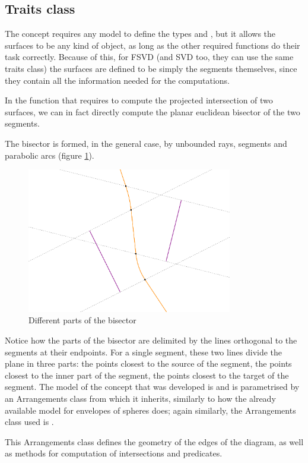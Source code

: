 \documentclass[11pt,a4paper,english]{article}
\begin{document}
	\subsection{Traits class }
	The  concept requires any model to define the types  and , but it allows the surfaces to be any kind of object, as long as the other required functions do their task correctly. Because of this, for FSVD (and SVD too, they can use the same traits class) the surfaces are defined to be simply the segments themselves, since they contain all the information needed for the computations.\par
	In the function that requires to compute the projected intersection of two surfaces, we can in fact directly compute the planar euclidean bisector of the two segments.\par
	The bisector is formed, in the general case, by unbounded rays, segments and parabolic arcs (figure \ref{fig:areas_of_influence}).\ppar
	\begin{figure}[h]
    \centering
    \includegraphics[width=0.8\textwidth]{areas_of_influence}
    \caption{Different parts of the bisector\label{fig:areas_of_influence}}
	\end{figure}
	Notice how the parts of the bisector are delimited by the lines orthogonal to the segments at their endpoints. For a single segment, these two lines divide the plane in three parts: the points closest to the source of the segment, the points closest to the inner part of the segment, the points closest to the target of the segment.\ppar
	The model of the concept  that was developed is   and is parametrised by an Arrangements class from which it inherits, similarly to how the already available model  for envelopes of spheres does; again similarly, the Arrangements class used is .\par
	This Arrangements class defines the geometry of the edges of the diagram, as well as methods for computation of intersections and predicates.
	
\end{document}
